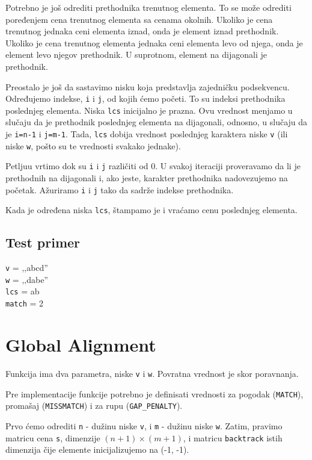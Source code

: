 Potrebno je još odrediti prethodnika trenutnog elementa. To se može odrediti poređenjem cena trenutnog elementa sa cenama okolnih. Ukoliko je cena trenutnog jednaka ceni elementa iznad, onda je element iznad prethodnik. Ukoliko je cena trenutnog elementa jednaka ceni elementa levo od njega, onda je element levo njegov prethodnik. U suprotnom, element na dijagonali je prethodnik.

Preostalo je još da sastavimo nisku koja predstavlja zajedničku podsekvencu. Određujemo indekse, \texttt{i} i \texttt{j}, od kojih ćemo početi. To su indeksi prethodnika poslednjeg elementa. Niska \texttt{lcs} inicijalno je prazna. Ovu vrednost menjamo u slučaju da je prethodnik poslednjeg elementa na dijagonali, odnosno, u slučaju da je \texttt{i=n-1} i \texttt{j=m-1}. Tada, \texttt{lcs} dobija vrednost poslednjeg karaktera niske \texttt{v} (ili niske \texttt{w}, pošto su te vrednosti svakako jednake).

Petljuu vrtimo dok su \texttt{i} i \texttt{j} različiti od 0. U svakoj iteraciji proveravamo da li je prethodnih na dijagonali i, ako jeste, karakter prethodnika nadovezujemo na početak. Ažuriramo \texttt{i} i \texttt{j} tako da sadrže indekse prethodnika. 

Kada je određena niska \texttt{lcs}, štampamo je i vraćamo cenu poslednjeg elementa.




\subsection{Test primer}

\noindent\texttt{v} = ‚‚abcd''
\\\texttt{w} = ‚‚dabe''
\\\texttt{lcs} = ab
\\\texttt{match} = 2 

\section{Global Alignment}

Funkcija ima dva parametra, niske \texttt{v} i \texttt{w}. Povratna vrednost je skor poravnanja.

Pre implementacije funkcije potrebno je definisati vrednosti za pogodak (\texttt{MATCH}), promašaj (\texttt{MISSMATCH}) i za rupu (\texttt{GAP\_PENALTY}).

Prvo ćemo odrediti \texttt{n} - dužinu niske \texttt{v}, i \texttt{m} - dužinu niske \texttt{w}. Zatim, pravimo matricu cena \texttt{s}, dimenzije $(n+1) \times (m+1)$, i matricu \texttt{backtrack} istih dimenzija čije elemente inicijalizujemo na (-1, -1). 

